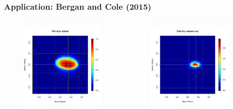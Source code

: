 \documentclass{beamer}
\begin{document}
\begin{frame}
\frametitle{Application: Bergan and Cole (2015)}
\vspace{-10mm}
\begin{columns}[c]

\begin{figure}
\centering
\includegraphics[trim = 11mm 0mm 9mm 0mm, clip, scale=0.39]{pval_plot_bergan_main.pdf}
\end{figure}

\begin{figure}
\centering
\includegraphics[trim = 11mm 0mm 9mm 0mm, clip, scale=0.39]{pval_plot_bergan_ideo_5nn.pdf}
\end{figure}


\end{columns}
\end{frame}
\end{document}
